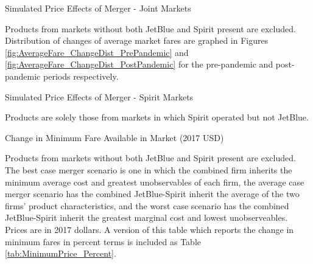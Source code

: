 \documentclass{article}
\begin{document}
    \begin{table}
        \caption{Simulated Price Effects of Merger - Joint Markets}
        \label{tab:Simulation_Price}
                \vspace{-15mm}
        \begin{center}
         
        \end{center}
        \vspace{-5mm}
        \footnotesize{Products from markets without both JetBlue and Spirit present are excluded. Distribution of changes of average market fares are graphed in Figures \ref{fig:AverageFare_ChangeDist_PrePandemic} and \ref{fig:AverageFare_ChangeDist_PostPandemic} for the pre-pandemic and post-pandemic periods respectively.}

     \end{table}


    \begin{table}
        \caption{Simulated Price Effects of Merger - Spirit Markets}
        \label{tab:Simulation_Price_Spirit}
                        \vspace{-15mm}
        \begin{center}
              
        \end{center}
        \vspace{-5mm}
        \footnotesize{Products are solely those from markets in which Spirit operated but not JetBlue.}
    \end{table}

        \begin{table}
        \caption{Change in Minimum Fare Available in Market (2017 USD)}
        \label{tab:MinimumPrice}
                \vspace{-15mm}
        \begin{center}
            
        \end{center}
        \vspace{-5mm}
        \footnotesize{Products from markets without both JetBlue and Spirit present are excluded. The best case merger scenario is one in which the combined firm inherits the minimum average cost and greatest unobservables of each firm, the average case merger scenario has the combined JetBlue-Spirit inherit the average of the two firms' product characteristics, and the worst case scenario has the combined JetBlue-Spirit inherit the greatest marginal cost and lowest unobserveables. Prices are in 2017 dollars. A version of this table which reports the change in minimum fares in percent terms is included as Table        \ref{tab:MinimumPrice_Percent}.}
    \end{table}    
\end{document}

